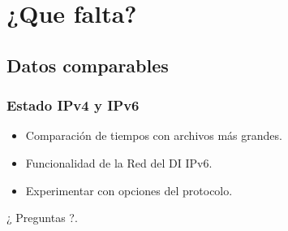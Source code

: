 \section{¿Que falta?}
\subsection{Datos comparables}
\begin{frame}
  \frametitle{Estado IPv4 y IPv6}
	\begin{itemize} [itemsep=2em] 
		\item
			Comparación de tiempos con archivos más grandes.
		\item
			Funcionalidad de la Red del DI IPv6.
		\item
			Experimentar con opciones del protocolo.
	\end{itemize}
\end{frame}

\begin{frame}
	\centering
		¿ Preguntas ?.
\end{frame}





